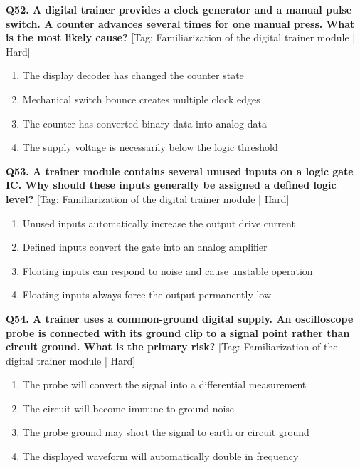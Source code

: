 \noindent\textbf{Q52. A digital trainer provides a clock generator and a manual pulse switch. A counter advances several times for one manual press. What is the most likely cause?} \hfill [Tag: Familiarization of the digital trainer module | Hard]
\begin{enumerate}[label=(\alph*),topsep=2pt,itemsep=1pt,partopsep=0pt,parsep=0pt]
    \item {The display decoder has changed the counter state}
    \item {Mechanical switch bounce creates multiple clock edges}
    \item {The counter has converted binary data into analog data}
    \item {The supply voltage is necessarily below the logic threshold}
\end{enumerate}
\vspace{2mm}

\noindent\textbf{Q53. A trainer module contains several unused inputs on a logic gate IC. Why should these inputs generally be assigned a defined logic level?} \hfill [Tag: Familiarization of the digital trainer module | Hard]
\begin{enumerate}[label=(\alph*),topsep=2pt,itemsep=1pt,partopsep=0pt,parsep=0pt]
    \item {Unused inputs automatically increase the output drive current}
    \item {Defined inputs convert the gate into an analog amplifier}
    \item {Floating inputs can respond to noise and cause unstable operation}
    \item {Floating inputs always force the output permanently low}
\end{enumerate}
\vspace{2mm}

\noindent\textbf{Q54. A trainer uses a common-ground digital supply. An oscilloscope probe is connected with its ground clip to a signal point rather than circuit ground. What is the primary risk?} \hfill [Tag: Familiarization of the digital trainer module | Hard]
\begin{enumerate}[label=(\alph*),topsep=2pt,itemsep=1pt,partopsep=0pt,parsep=0pt]
    \item {The probe will convert the signal into a differential measurement}
    \item {The circuit will become immune to ground noise}
    \item {The probe ground may short the signal to earth or circuit ground}
    \item {The displayed waveform will automatically double in frequency}
\end{enumerate}
\vspace{2mm}

